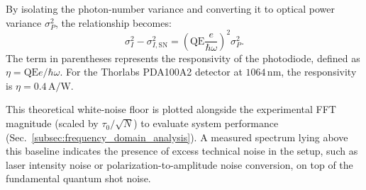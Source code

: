 By isolating the photon-number variance and converting it to optical power variance $\sigma_P^2$, the relationship becomes:
\begin{equation}
    \sigma_I^2 - \sigma_{I, \mathrm{SN}}^2
    = 
    \left( \mathrm{QE} \frac{e}{\hbar\omega} \right)^2 \sigma_P^2.
\end{equation}
The term in parentheses represents the responsivity of the photodiode, defined as $\eta = \mathrm{QE} e / \hbar\omega$. For the Thorlabs PDA100A2 detector at $1064\,\mathrm{nm}$, the responsivity is $\eta = 0.4\,\mathrm{A/W}$.


This theoretical white-noise floor is plotted alongside the experimental FFT magnitude (scaled by $\tau_0/\sqrt{N}$) to evaluate system performance (Sec.~\ref{subsec:frequency_domain_analysis}). A measured spectrum lying above this baseline indicates the presence of excess technical noise in the setup, such as laser intensity noise or polarization-to-amplitude noise conversion, on top of the fundamental quantum shot noise.